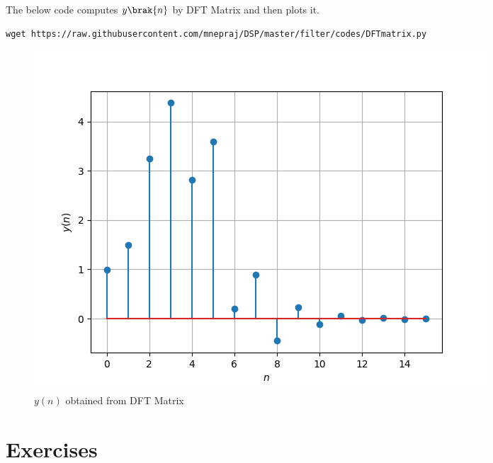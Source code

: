 \documentclass[journal, 12pt, twocolumn]{IEEEtran}
\renewcommand\thesection{\arabic{section}}
\begin{document}
\begin{enumerate}[label=\thesection.\arabic*]
	      The below code computes $y\brak{n}$ by DFT Matrix and then plots it.
	      \begin{lstlisting}
wget https://raw.githubusercontent.com/mnepraj/DSP/master/filter/codes/DFTmatrix.py
\end{lstlisting}
	      \begin{figure}[h]
		      \centering
		      \includegraphics[width=\columnwidth]{figs/ynDFTmatrix.png}
		      \caption{$y(n)$ obtained from DFT Matrix}
		      \label{fig:yn_DFT_matrix}
	      \end{figure}
\end{enumerate}
%
\section{Exercises}
\end{document}
